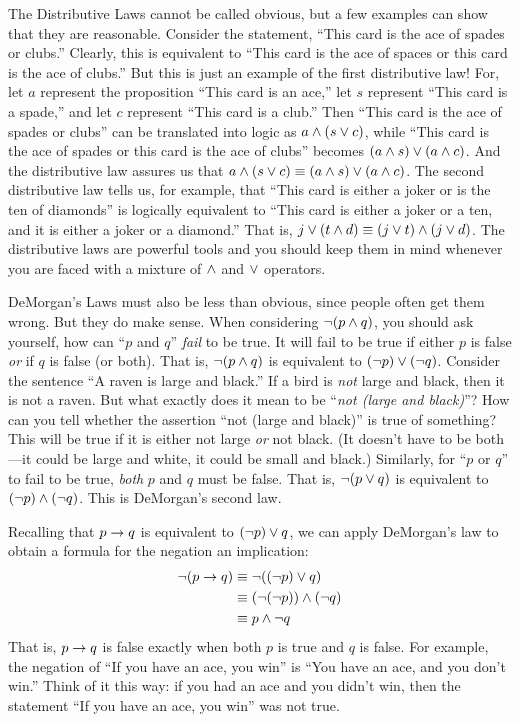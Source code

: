 The Distributive Laws cannot be called obvious, but a few
examples can show that they are reasonable.  Consider the statement, ``This 
card is the ace of spades or clubs.''  Clearly, this is equivalent to ``This
card is the ace of spaces or this card is the ace of clubs.''  But this is
just an example of the first distributive law!  For, let $a$ represent the
proposition ``This card is an ace,'' let $s$ represent ``This card is a spade,''
and let $c$ represent ``This card is a club.''  Then ``This card is the ace of
spades or clubs'' can be translated into logic as $a\wedge(s\vee c)$, while
``This card is the ace of spades or this card is the ace of clubs'' becomes
$(a\wedge s)\vee (a\wedge c)$.  And the distributive law assures us that
$a\wedge(s\vee c)\equiv(a\wedge s)\vee (a\wedge c)$.  The second distributive
law tells us, for example, that ``This card is either a joker or is the ten of diamonds''
is logically equivalent to ``This card is either a joker or a ten, and it is either
a joker or a diamond.''  That is, $j\vee(t\wedge d)\equiv(j\vee t)\wedge(j\vee d)$.
The distributive laws are powerful
tools and you should keep them in mind whenever you are faced with a
mixture of $\wedge$ and $\vee$ operators.

DeMorgan's Laws must also be less than obvious, since people often get
them wrong.  But they do make sense.  When considering $\lnot(p\wedge q)$,
you should ask yourself, how can ``$p$ and $q$'' \emph{fail} to be true.
It will fail to be true if either $p$ is false \emph{or} if $q$ is false (or both).
That is, $\lnot(p \wedge q)$ is equivalent to $(\lnot p)\vee(\lnot q)$.  Consider
the sentence ``A raven is large and black.''  If a bird is \emph{not} large and black,
then it is not a raven.  But what exactly does it mean to be
``\emph{not (large and black)}''?  How can you tell whether the assertion ``not (large
and black)'' is true of something?  This will be true if it is either
not large \emph{or} not black.  (It doesn't have to be both---it could be
large and white, it could be small and black.)  Similarly, for ``$p$ or $q$''
to fail to be true, \emph{both} $p$ and $q$ must be false.  That
is, $\lnot(p\vee q)$ is equivalent to $(\lnot p)\wedge (\lnot q)$.  This is DeMorgan's
second law.

Recalling that $p\rightarrow q$ is equivalent to $(\lnot p)\vee q$, we can apply DeMorgan's
law to obtain a formula for the negation an implication:
\begin{align*}
     \lnot(p\rightarrow q)&\equiv \lnot((\lnot p)\vee q)\\
                   &\equiv (\lnot(\lnot p))\wedge(\lnot q)\\
                   &\equiv p\wedge\lnot q\\
\end{align*}
That is, $p\rightarrow q$ is false exactly when both $p$ is true and $q$ is false.
For example, the negation of ``If you have an ace, you win'' is
``You have an ace, and you don't win.''  Think of it this way:  if you had an
ace and you didn't win, then the statement ``If you have an ace, you win''
was not true.


